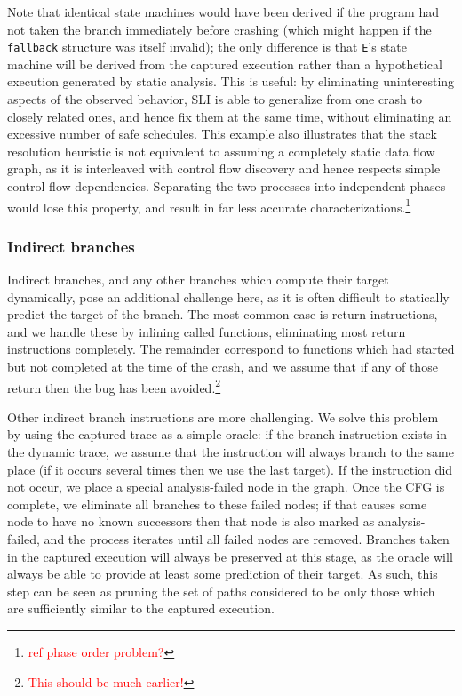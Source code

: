 \documentclass[10pt,twocolumn,preprint,natbib,authoryear]{sigplanconf}
\newcommand{\editorial}[1]{\textcolor{red}{\footnote{\textcolor{red}{#1}}}}
\begin{document}
Note that identical state machines would have been derived if the
program had not taken the branch immediately before crashing (which
might happen if the \verb|fallback| structure was itself invalid); the
only difference is that \verb|E|'s state machine will be derived from
the captured execution rather than a hypothetical execution generated
by static analysis.  This is useful: by eliminating uninteresting
aspects of the observed behavior, SLI is able to generalize from one
crash to closely related ones, and hence fix them at the same time,
without eliminating an excessive number of safe schedules.  This
example also illustrates that the stack resolution heuristic is not
equivalent to assuming a completely static data flow graph, as it is
interleaved with control flow discovery and hence respects simple
control-flow dependencies.  Separating the two processes into
independent phases would lose this property, and result in far less
accurate characterizations.\editorial{ref phase order problem?}

\subsubsection{Indirect branches}
Indirect branches, and any other branches which compute their target
dynamically, pose an additional challenge here, as it is often
difficult to statically predict the target of the branch.  The most
common case is return instructions, and we handle these by inlining
called functions, eliminating most return instructions completely.
The remainder correspond to functions which had started but not
completed at the time of the crash, and we assume that if any of those
return then the bug has been avoided.\editorial{This should be much
  earlier!}

Other indirect branch instructions are more challenging.  We solve
this problem by using the captured trace as a simple oracle: if the
branch instruction exists in the dynamic trace, we assume that the
instruction will always branch to the same place (if it occurs several
times then we use the last target).  If the instruction did not occur,
we place a special analysis-failed node in the graph.  Once the CFG is
complete, we eliminate all branches to these failed nodes; if that
causes some node to have no known successors then that node is also
marked as analysis-failed, and the process iterates until all failed
nodes are removed.  Branches taken in the captured execution will
always be preserved at this stage, as the oracle will always be able
to provide at least some prediction of their target.  As such, this
step can be seen as pruning the set of paths considered to be only
those which are sufficiently similar to the captured execution.
\end{document}
